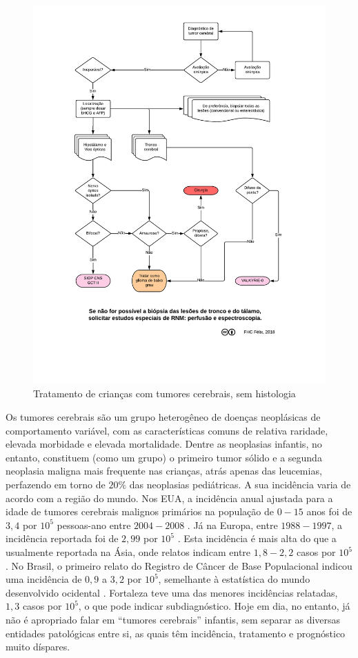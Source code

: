 \documentclass[11pt,a4paper,oldfontcommands]{memoir}
\begin{document}
\begin{center}
\begin{figure}[!htb]
\includegraphics[scale=0.86,trim = 20mm 5mm 10mm 8mm,clip]{fig/fig2.pdf}
\caption{Tratamento de crianças com tumores cerebrais, sem histologia}
\end{figure}
\end{center}

Os tumores cerebrais são um grupo heterogêneo de doenças neoplásicas de comportamento variável, com as características comuns de relativa raridade, elevada morbidade e elevada mortalidade. Dentre as neoplasias infantis, no entanto, constituem (como um grupo) o primeiro tumor sólido e a segunda neoplasia maligna mais frequente nas crianças, atrás apenas das leucemias, perfazendo em torno de \(20\%\) das neoplasias pediátricas. A sua incidência varia de acordo com a região do mundo. Nos EUA, a incidência anual ajustada para a idade de tumores cerebrais malignos primários na população de \(0-15\) anos foi de \(3,4\) por \(10^5\) pessoas-ano entre \(2004-2008\) \cite{Ostrom01102014}. Já na Europa, entre \(1988-1997\), a incidência reportada foi de \(2,99\) por \(10^5\) \cite{Peris-Bonet}. Esta incidência é mais alta do que a usualmente reportada na Ásia, onde relatos indicam entre \(1,8-2,2\) casos por \(10^5\) \cite{CNCR21430}. No Brasil, o primeiro relato do Registro de Câncer de Base Populacional indicou uma incidência de \(0,9\) a \(3,2\) por \(10^5\), semelhante à estatística do mundo desenvolvido ocidental \cite{IJC24799}. Fortaleza teve uma das menores incidências relatadas, \(1,3\) casos por \(10^5\), o que pode indicar subdiagnóstico. Hoje em dia, no entanto, já não é apropriado falar em “tumores cerebrais” infantis, sem separar as diversas entidades patológicas entre si, as quais têm incidência, tratamento e prognóstico muito díspares.
\end{document}
